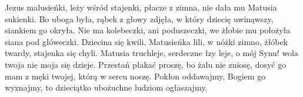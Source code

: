 \beginverse
Jezus malusieńki, leży wśród stajenki,
płacze z zimna, nie dała mu Matusia sukienki.
\endverse
\beginverse
Bo uboga była, rąbek z głowy zdjęła,
w który dziecię uwinąwszy, siankiem go okryła.
\endverse
\beginverse
Nie ma kolebeczki, ani poduszeczki,
we żłobie mu położyła siana pod główeczki.
\endverse
\beginverse
Dziecina się kwili, Matusieńka lili,
w nóżki zimno, żłóbek twardy, stajenka się chyli.
\endverse
\beginverse
Matusia truchleje, serdeczne łzy leje,
o mój Synu! wola twoja nie moja się dzieje.
\endverse
\beginverse
Przestań płakać proszę, bo żalu nie zniosę,
dosyć go mam z męki twojej, którą w sercu noszę.
\endverse
\beginverse
Pokłon oddawajmy, Bogiem go wyznajmy,
to dzieciątko ubożuchne ludziom ogłaszajmy.
\endverse
\endsong